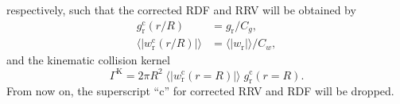 \documentclass[../thesis.tex]{subfiles}
\begin{document}
respectively, such that the corrected RDF and RRV will be obtained by
\begin{align}
g_\text{r}^\text{c} (r/R)&=g_\text{r}/C_g,\label{eq:36} \\
\langle|w_\text{r}^\text{c} (r/R)|\rangle&=\langle|w_\text{r}|\rangle/C_w,\label{eq:37}
\end{align}
and the kinematic collision kernel
\begin{equation}
\Gamma^\text{K}=2\pi R^2 \; \langle|w_\text{r}^\text{c} (r=R)|\rangle \; g_\text{r}^\text{c} (r=R).\label{eq:38}
\end{equation}
From now on, the superscript ``c'' for corrected RRV and RDF will be dropped.



%
%
\newpage
\end{document}

